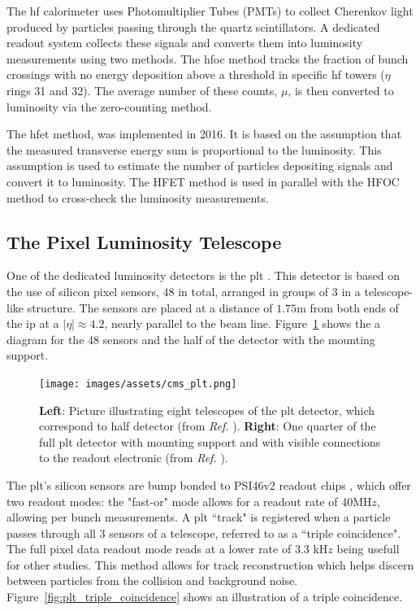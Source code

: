 The \acrshort{hf} calorimeter uses Photomultiplier Tubes (PMTs) to collect Cherenkov light produced by particles passing through the quartz scintillators. A dedicated readout system collects these signals and converts them into luminosity measurements using two methods. The \acrshort{hfoc} method tracks the fraction of bunch crossings with no energy deposition above a threshold in specific \acrshort{hf} towers ($\eta$ rings 31 and 32). The average number of these counts, $\mu$, is then converted to luminosity via the zero-counting method.

The \acrshort{hfet} method, was implemented in 2016. It is based on the assumption that the measured transverse energy sum is proportional to the luminosity. This assumption is used to estimate the number of particles depositing signals and convert it to luminosity. The HFET method is used in parallel with the HFOC method to cross-check the luminosity measurements.

\subsection{The Pixel Luminosity Telescope}
\label{subsubsec:plt}

One of the dedicated luminosity detectors is the \acrfull{plt} \cite{CMS-DP-2021-020}. This detector is based on the use of silicon pixel sensors, 48 in total, arranged in groups of 3 in a telescope-like structure. The sensors are placed at a distance of $1.75$m from both ends of the \acrshort{ip} at a $|\eta| \approx 4.2$, nearly parallel to the beam line. Figure~\ref{fig:cms_plt} shows the a diagram for the 48 sensors and the half of the detector with the mounting support.

\begin{figure}[H]
	\centering
	\texttt{[image: images/assets/cms\_plt.png]}
	\caption[PLT detector telescopes]{\textbf{Left}: Picture illustrating eight telescopes of the \acrshort{plt} detector, which correspond to half detector (from \textit{Ref.} \cite{Romeo:2797807}). \textbf{Right}: One quarter of the full \acrshort{plt} detector with mounting support and with visible connections to the readout electronic (from \textit{Ref.} \cite{DelannoySotomayor:2765247}).}
	\label{fig:cms_plt}
\end{figure}

The \acrshort{plt}'s silicon sensors are bump bonded to PSI46v2 readout chips \cite{KASTLI2006188}, which offer two readout modes: the "fast-or" mode allows for a readout rate of 40MH$z$, allowing per bunch measurements. A \acrshort{plt} ``track" is registered when a particle passes through all 3 sensors of a telescope, referred to as a ``triple coincidence". The full pixel data readout mode reads at a lower rate of 3.3 kH$z$ being usefull for other studies. This method allows for track reconstruction which helps discern between particles from the collision and background noise. Figure~\ref{fig:plt_triple_coincidence} shows an illustration of a triple coincidence.

